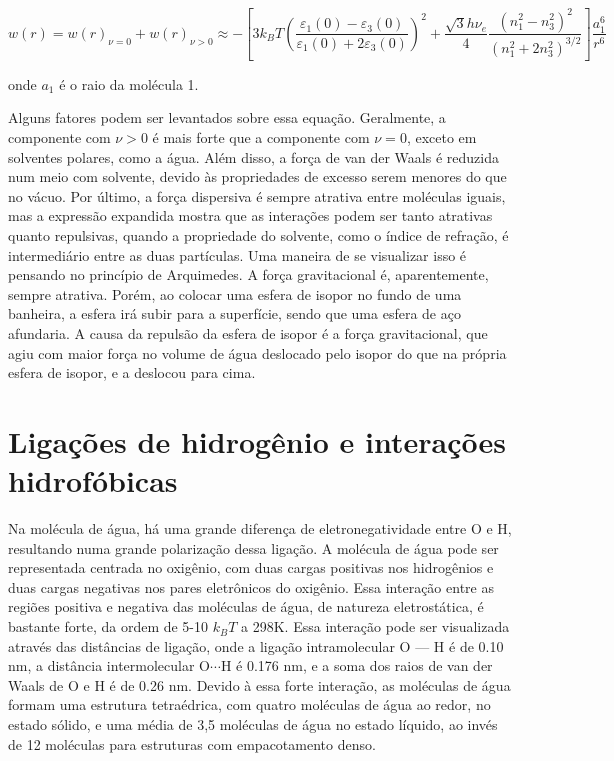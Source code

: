 	\begin{equation}
		w ( r ) = w ( r ) _ { \nu = 0 } + w ( r ) _ { \nu > 0 } \approx - \left[ 3 k_B T \left( \frac { \varepsilon _ { 1 } ( 0 ) - \varepsilon _ { 3 } ( 0 ) } { \varepsilon _ { 1 } ( 0 ) + 2 \varepsilon _ { 3 } ( 0 ) } \right) ^ { 2 } + \frac { \sqrt { 3 } h \nu _ { e } } { 4 } \frac { \left( n _ { 1 } ^ { 2 } - n _ { 3 } ^ { 2 } \right) ^ { 2 } } { \left( n _ { 1 } ^ { 2 } + 2 n _ { 3 } ^ { 2 } \right) ^ { 3 / 2 } } \right] \frac { a _ { 1 } ^ { 6 } } { r ^ { 6 } }
		\label{eqn:energia_maclachlan}
	\end{equation} 
	
	\noindent onde \(a_1\) é o raio da molécula 1.
	
	Alguns fatores podem ser levantados sobre essa equação. Geralmente, a componente com \(\nu > 0\) é mais forte que a componente com \(\nu = 0\), exceto em solventes polares, como a água. Além disso, a força de van der Waals é reduzida num meio com solvente, devido às propriedades de excesso serem menores do que no vácuo. Por último, a força dispersiva é sempre atrativa entre moléculas iguais\cite{Hamaker1937}, mas a expressão expandida mostra que as interações podem ser tanto atrativas quanto repulsivas, quando a propriedade do solvente, como o índice de refração, é intermediário entre as duas partículas. Uma maneira de se visualizar isso é pensando no princípio de Arquimedes. A força gravitacional é, aparentemente, sempre atrativa. Porém, ao colocar uma esfera de isopor no fundo de uma banheira, a esfera irá subir para a superfície, sendo que uma esfera de aço afundaria. A causa da repulsão da esfera de isopor é a força gravitacional, que agiu com maior força no volume de água deslocado pelo isopor do que na própria esfera de isopor, e a deslocou para cima. 
	
	\section{Ligações de hidrogênio e interações hidrofóbicas}   \label{sec:ligacoes_hidrogenio}
	
	Na molécula de água, há uma grande diferença de eletronegatividade entre O e H, resultando numa grande polarização dessa ligação. A molécula de água pode ser representada centrada no oxigênio, com duas cargas positivas nos hidrogênios e duas cargas negativas nos pares eletrônicos do oxigênio. Essa interação entre as regiões positiva e negativa das moléculas de água, de natureza eletrostática, é bastante forte, da ordem de 5-10 \(k_BT\) a 298K. Essa interação pode ser visualizada através das distâncias de ligação, onde a ligação intramolecular O --- H é de 0.10 nm, a distância intermolecular \(\mathrm{O} \cdots \mathrm{H}\) é 0.176 nm, e a soma dos raios de van der Waals de O e H é de 0.26 nm. Devido à essa forte interação, as moléculas de água formam uma estrutura tetraédrica, com quatro moléculas de água ao redor, no estado sólido, e uma média de 3,5 moléculas de água no estado líquido, ao invés de 12 moléculas para estruturas com empacotamento denso.
	
